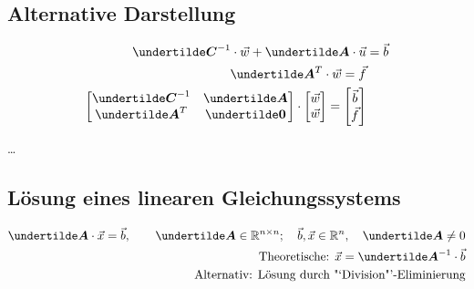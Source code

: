 \subsection{Alternative Darstellung}
\begin{align*}
\ma{C}^{-1} \cdot \vec{w} + \ma{A} \cdot \vec{u} &= \vec{b}\\
\ma{A}^T \cdot \vec{w} = \vec{f}\\
\begin{bmatrix}
\ma{C}^{-1} & \ma{A} \\ \ma{A}^T & \ma{0}\end{bmatrix} \cdot \begin{bmatrix}\vec{w} \\ \vec{w}\end{bmatrix} = \begin{bmatrix}\vec{b}\\\vec{f}\end{bmatrix}
\end{align*}

\ldots

\subsection{Lösung eines linearen Gleichungssystems}
\begin{align*}
\ma{A} \cdot \vec{x} = \vec{b}, \qquad \ma{A} \in \mathbb{R}^{n\times n}; \quad \vec{b}, \vec{x} \in \mathbb{R}^n, \quad \ma{A} \neq 0\\
\text{Theoretische: } \vec{x} = \ma{A}^{-1} \cdot \vec{b}\\
\text{Alternativ: Lösung durch "`Division"'-Eliminierung} 
\end{align*}

